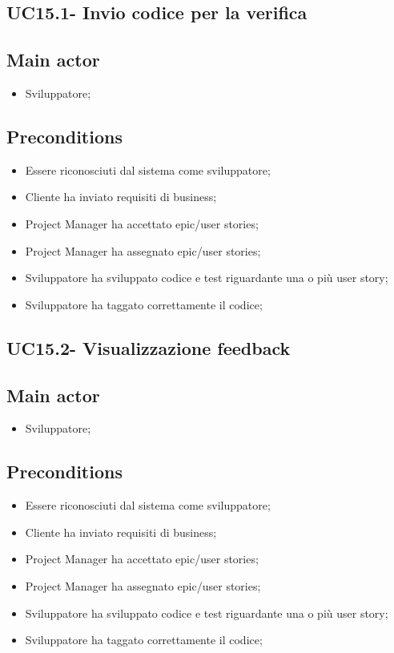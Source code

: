 \documentclass{article}
\begin{document}
    \subsection{UC15.1- Invio codice per la verifica}
    \subsection*{Main actor}
        \begin{itemize}
            \item Sviluppatore;
        \end{itemize}
        
    \subsection*{Preconditions}
        \begin{itemize}
            \item Essere riconosciuti dal sistema come sviluppatore;
            \item Cliente ha inviato requisiti di business;
            \item Project Manager ha accettato epic/user stories;
            \item Project Manager ha assegnato epic/user stories;
            \item Sviluppatore ha sviluppato codice e test riguardante una o più user story;
            \item Sviluppatore ha taggato correttamente il codice;
        \end{itemize}
        
    \subsection{UC15.2- Visualizzazione feedback}
    \subsection*{Main actor}
        \begin{itemize}
            \item Sviluppatore;
        \end{itemize}
        
    \subsection*{Preconditions}
        \begin{itemize}
            \item Essere riconosciuti dal sistema come sviluppatore;
            \item Cliente ha inviato requisiti di business;
            \item Project Manager ha accettato epic/user stories;
            \item Project Manager ha assegnato epic/user stories;
            \item Sviluppatore ha sviluppato codice e test riguardante una o più user story;
            \item Sviluppatore ha taggato correttamente il codice;
        \end{itemize}
        
\end{document}
